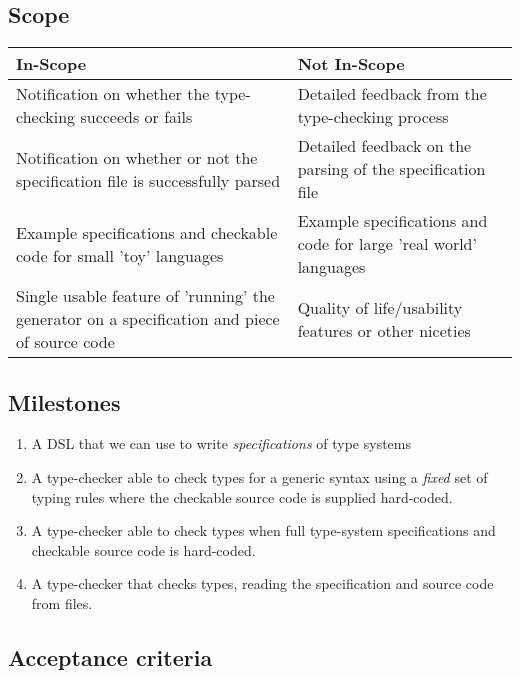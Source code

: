   \subsection{Scope}
  \label{sec-scope}

  \begin{center}
  \begin{tabular}{p{20em}|p{18em}}
    \large In-Scope & \large Not In-Scope \\ \hline \hline
    Notification on whether the type-checking succeeds
    or fails
    & Detailed feedback from the type-checking process \\ \hline
    Notification on whether or not the specification file is
    successfully parsed
    & Detailed feedback on the parsing of the specification file \\ \hline
    Example specifications and checkable code for small 'toy' languages
    & Example specifications and code for large 'real world' languages \\ \hline
    Single usable feature of 'running' the generator on a
    specification and piece of source code
    & Quality of life/usability features or other niceties \\ \hline
  \end{tabular}            
  \end{center}        
  
  \subsection{Milestones}
  \label{section-milestones}

  \begin{enumerate}
  \item A DSL that we can use to write \emph{specifications}
    of type systems
  \item A type-checker able to check types for a generic syntax
    using a \emph{fixed} set of typing rules where the checkable
    source code is supplied hard-coded.
  \item A type-checker able to check types when full type-system
    specifications and checkable source code is hard-coded.
  \item A type-checker  that checks types, reading
    the specification and source code from files.
  \end{enumerate}
  
  \subsection{Acceptance criteria}
  \label{sec-acceptance}

